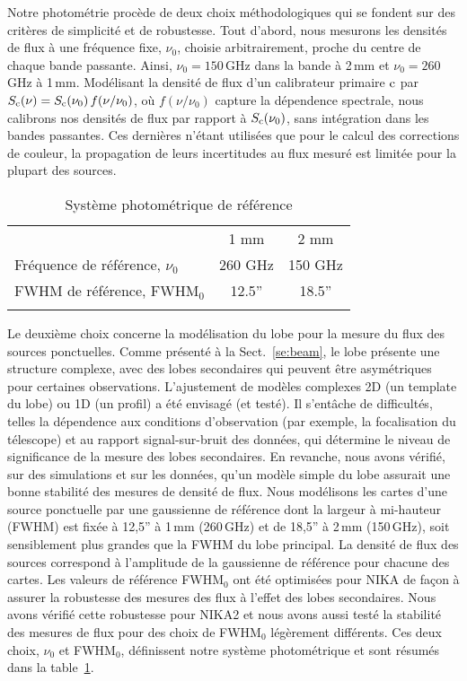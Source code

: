 Notre photométrie procède de deux choix méthodologiques qui se fondent
sur des critères de simplicité et de robustesse. Tout d'abord, nous
mesurons les densités de flux à une fréquence fixe, $\nu_0$, choisie
arbitrairement, proche du centre de chaque bande passante. Ainsi,
$\nu_0 = 150$\,GHz dans la bande à 2\,mm et $\nu_0 = 260$\,GHz à
1\,mm. Modélisant la densité de flux d'un calibrateur primaire
$\rm{c}$ par $S_{\rm{c}} (\nu) = S_{\rm{c}} (\nu_0)\, f(\nu/\nu_0)$,
où $f(\nu/\nu_0)$ capture la dépendence spectrale, nous calibrons nos
densités de flux par rapport à $S_{\rm{c}} (\nu_0)$, sans intégration
dans les bandes passantes. Ces dernières n'étant utilisées que pour le
calcul des corrections de couleur, la propagation de leurs
incertitudes au flux mesuré est limitée pour la plupart des sources.
%
\begin{table}[!htbp]
\caption{Système photométrique de référence}
\label{tab:definitions}
\centering     
\begin{tabular}{lcc}
\hline\hline
      \noalign{\smallskip}
      & 1 mm & 2 mm \\
      \noalign{\smallskip}
      \hline
      \noalign{\smallskip}
      Fréquence de référence, $\nu_{0}$ & 260 GHz & 150 GHz \\
      FWHM de référence,  FWHM$_{0}$    & 12.5'' & 18.5'' \\
      \noalign{\smallskip}
      \hline
\end{tabular}
\end{table}
%

Le deuxième choix concerne la modélisation du lobe pour la mesure du
flux des sources ponctuelles. Comme présenté à la
Sect.~\ref{se:beam}, le lobe présente une structure complexe, avec
des lobes secondaires qui peuvent être asymétriques pour certaines
observations. L'ajustement de modèles complexes 2D (un template du
lobe) ou 1D (un profil) a été envisagé (et testé). Il s'entâche de
difficultés, telles la dépendence aux conditions d'observation (par
exemple, la focalisation du télescope) et au rapport signal-sur-bruit
des données, qui détermine le niveau de significance de la mesure des
lobes secondaires. En revanche, nous avons vérifié, sur des simulations
et sur les données, qu'un modèle simple du lobe assurait une bonne
stabilité des mesures de densité de flux.
Nous modélisons les cartes d'une source ponctuelle par une gaussienne
de référence dont la largeur à mi-hauteur (FWHM) est fixée à 
12,5'' à 1\,mm (260\,GHz) et de 18,5'' à 2\,mm (150\,GHz), soit
sensiblement plus grandes que la FWHM du lobe principal. La densité de
flux des sources correspond à l'amplitude de la gaussienne de
référence pour chacune des cartes. Les valeurs de référence FWHM$_0$ ont
été optimisées pour NIKA de façon à assurer la robustesse des mesures
des flux à l'effet des lobes secondaires. Nous avons vérifié cette
robustesse pour NIKA2 et nous avons aussi testé la stabilité des
mesures de flux pour des choix de FWHM$_0$ légèrement différents. Ces
deux choix, $\nu_0$ et FWHM$_0$, définissent notre système
photométrique et sont résumés dans la table~\ref{tab:definitions}.

